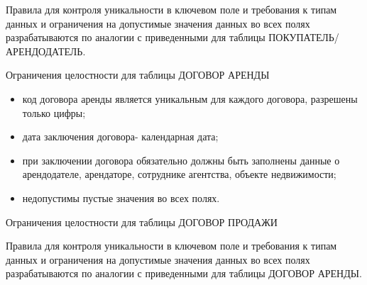 Правила для контроля уникальности в ключевом поле и требования к типам данных и ограничения на допустимые значения данных во всех полях разрабатываются по аналогии с приведенными для таблицы ПОКУПАТЕЛЬ/АРЕНДОДАТЕЛЬ.

Ограничения целостности для таблицы ДОГОВОР АРЕНДЫ
\begin{itemize}
\item	код договора аренды является уникальным для каждого договора, разрешены только цифры;

\item	дата заключения договора- календарная дата;

\item	при заключении договора обязательно должны быть заполнены данные о арендодателе, арендаторе, сотруднике агентства, объекте недвижимости;

\item	недопустимы пустые значения во всех полях.
\end{itemize}
Ограничения целостности для таблицы ДОГОВОР ПРОДАЖИ

	Правила для контроля уникальности в ключевом поле и требования к типам данных и ограничения на допустимые значения данных во всех полях разрабатываются по аналогии с приведенными для таблицы ДОГОВОР АРЕНДЫ.


